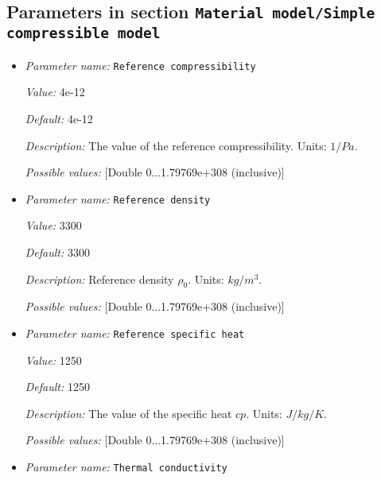 \subsection{Parameters in section \tt Material model/Simple compressible model}
\label{parameters:Material_20model/Simple_20compressible_20model}

\begin{itemize}
\item {\it Parameter name:} {\tt Reference compressibility}
\label{parameters:Material model/Simple compressible model/Reference compressibility}


{\it Value:} 4e-12


{\it Default:} 4e-12


{\it Description:} The value of the reference compressibility. Units: $1/Pa$.


{\it Possible values:} [Double 0...1.79769e+308 (inclusive)]
\item {\it Parameter name:} {\tt Reference density}
\label{parameters:Material model/Simple compressible model/Reference density}


{\it Value:} 3300


{\it Default:} 3300


{\it Description:} Reference density $\rho_0$. Units: $kg/m^3$.


{\it Possible values:} [Double 0...1.79769e+308 (inclusive)]
\item {\it Parameter name:} {\tt Reference specific heat}
\label{parameters:Material model/Simple compressible model/Reference specific heat}


{\it Value:} 1250


{\it Default:} 1250


{\it Description:} The value of the specific heat $cp$. Units: $J/kg/K$.


{\it Possible values:} [Double 0...1.79769e+308 (inclusive)]
\item {\it Parameter name:} {\tt Thermal conductivity}
\label{parameters:Material model/Simple compressible model/Thermal conductivity}



\end{itemize}
